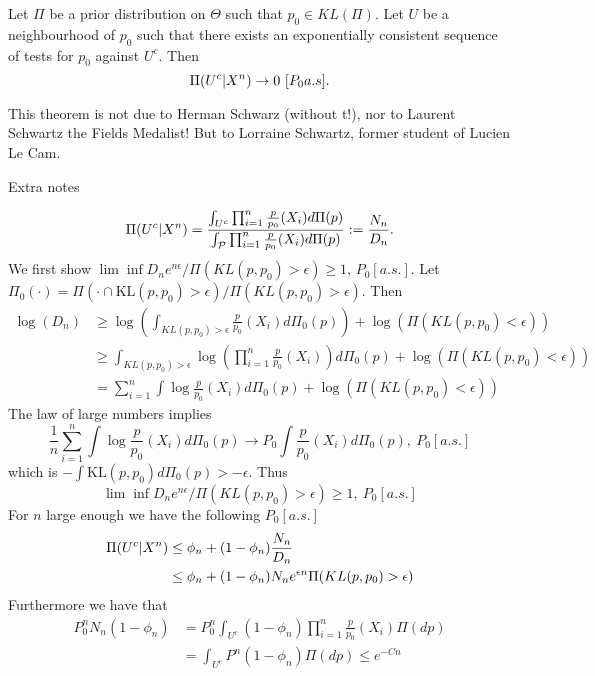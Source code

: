 \begin{theorem}
Let $\Pi$ be a prior distribution on $\Theta$ such that $p_0\in KL(\Pi)$. Let $U$ be a neighbourhood of $p_0$ such that there exists an exponentially consistent sequence of tests for $p_0$ against $U^c$. Then 
$$
\Pi(U^c | X^n) \to 0 ~ [P_0 a.s].
$$
\end{theorem}

This theorem is not due to Herman Schwarz (without t!), nor to Laurent Schwartz the Fields Medalist! But to Lorraine Schwartz, former student of Lucien Le Cam.









{Extra notes} 

$$
\Pi(U^c|X^n) = {\int_{U^c} \prod_{i=1}^n  \frac{p}{p_0}(X_i) d\Pi(p) \over \int_{\mathcal{P}} \prod_{i=1}^n  \frac{p}{p_0}(X_i) d\Pi(p)} := \frac{N_n}{D_n}.
$$
We first show $\lim\inf D_n e^{n\epsilon} / \Pi(KL(p,p_0)>\epsilon)   \geq 1 $, $P_0[a.s.]$. Let $\Pi_0(\cdot) = \Pi(\cdot \cap \text{KL}(p,p_0)>\epsilon)/\Pi(KL(p,p_0)>\epsilon)$. Then 
\begin{align*}
\log(D_n) &\geq \log\left(\int_{KL(p,p_0)>\epsilon} \frac{p}{p_0}(X_i) d\Pi_0(p)\right) + \log(\Pi(KL(p,p_0)<\epsilon)) \\ 
&\geq \int_{KL(p,p_0)>\epsilon} \log\left( \prod_{i=1}^n  \frac{p}{p_0}(X_i) \right) d\Pi_0(p) + \log(\Pi(KL(p,p_0)<\epsilon)) \\ 
&=  \sum_{i=1}^n \int \log \frac{p}{p_0}(X_i) d\Pi_0(p) + \log(\Pi(KL(p,p_0)<\epsilon)) 
\end{align*}
The law of large numbers implies 
$$
\frac{1}{n} \sum_{i=1}^n \int \log \frac{p}{p_0}(X_i) d\Pi_0(p) \to P_0 \int \frac{p}{p_0}(X_i) d\Pi_0(p),~ P_0[a.s.] 
$$
which is $- \int \text{KL}(p,p_0) d\Pi_0(p) > -\epsilon $.
Thus 
$$
\lim\inf D_n e^{n\epsilon} / \Pi(KL(p,p_0)>\epsilon)   \geq 1 ,~ P_0[a.s.]
$$ 
	For $n$ large enough we have the following $P_0[a.s.]$ 
	\begin{align*}
	\Pi(U^c|X^n) & \leq  \phi_n + (1-\phi_n) \frac{N_n}{D_n} \\
                 & \leq \phi_n  + (1-\phi_n) N_n e^{\epsilon n } \Pi(KL(p,p_0)>\epsilon)  
	\end{align*}
Furthermore we have that 
\begin{align*}
P_0^n  N_n (1-\phi_n) &= P_0^n  \int_{U^c} (1-\phi_n) \prod_{i=1}^{n} \frac{p}{p_0}(X_i) \Pi(dp) \\ 
                      &= \int_{U^c} P^n (1-\phi_n) \Pi(dp) \leq e^{-Cn} 
\end{align*}

